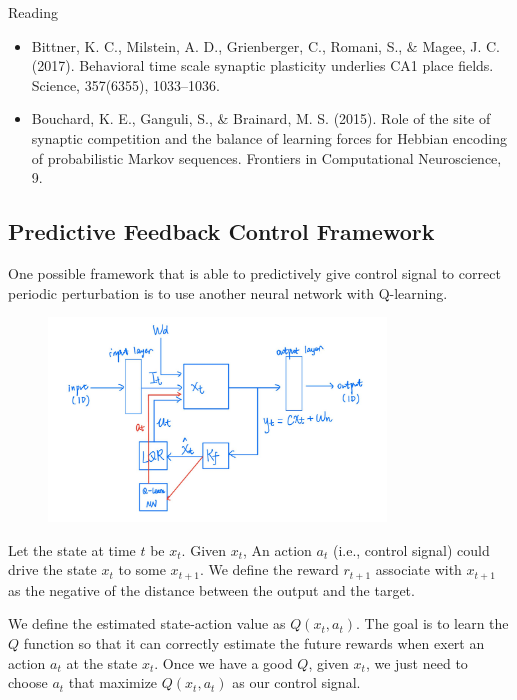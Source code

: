 \documentclass[12pt, a4paper]{article}
\begin{document}
\noindent
Reading

\begin{itemize}
    \item Bittner, K. C., Milstein, A. D., Grienberger, C., Romani, S., \& Magee, J. C. (2017). Behavioral time scale synaptic plasticity underlies CA1 place fields. Science, 357(6355), 1033–1036.
    \item Bouchard, K. E., Ganguli, S., \& Brainard, M. S. (2015). Role of the site of synaptic competition and the balance of learning forces for Hebbian encoding of probabilistic Markov sequences. Frontiers in Computational Neuroscience, 9.
\end{itemize}

\newpage

\subsection*{Predictive Feedback Control Framework}

One possible framework that is able to predictively give control signal to correct periodic perturbation is to use another neural network with Q-learning.

\begin{figure}[H]
    \centering
    \includegraphics[width=0.8\textwidth]{analysis/fig/qlearn_struc.jpg}
    \label{fig:1}
\end{figure}

Let the state at time $t$ be $x_t$. Given $x_t$, An action $a_t$ (i.e., control signal) could drive the state $x_t$ to some $x_{t+1}$. We define the reward $r_{t+1}$ associate with $x_{t+1}$ as the negative of the distance between the output and the target.

We define the estimated state-action value as $Q(x_t, a_t)$. The goal is to learn the $Q$ function so that it can correctly estimate the future rewards when exert an action $a_t$ at the state $x_t$. Once we have a good $Q$, given $x_t$, we just need to choose $a_t$ that maximize $Q(x_t, a_t)$ as our control signal.
\end{document}
